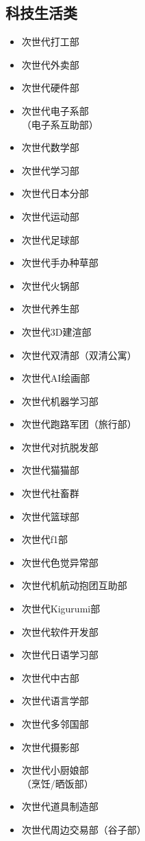 \documentclass[twoside,12pt]{book}
\newenvironment{categorysection}[1]{
  \subsection*{\textcolor{truepurple}{#1}}
  \begin{itemize}[leftmargin=*, 
                 nosep,               %
                 itemsep=2pt,         %
                 parsep=0pt,          %
                 before=\setlength{\baselineskip}{23pt} %
  ]
}{
  \end{itemize}
}
\begin{document}
\begin{multicols}{3}
    \begin{categorysection}{科技生活类}
        \item 次世代打工部
        \item 次世代外卖部
        \item 次世代硬件部
        \item 次世代电子系部\\（电子系互助部）
        \item 次世代数学部
        \item 次世代学习部
        \item 次世代日本分部
        \item 次世代运动部
        \item 次世代足球部
        \item 次世代手办种草部
        \item 次世代火锅部
        \item 次世代养生部
        \item 次世代3D建渲部
        \item 次世代双清部（双清公寓）
        \item 次世代AI绘画部
        \item 次世代机器学习部
        \item 次世代跑路军团（旅行部）
        \item 次世代对抗脱发部
        \item 次世代猫猫部
        \item 次世代社畜群
        \item 次世代篮球部
        \item 次世代f1部
        \item 次世代色觉异常部
        \item 次世代机航动抱团互助部
        \item 次世代Kigurumi部
        \item 次世代软件开发部
        \item 次世代日语学习部
        \item 次世代中古部
        \item 次世代语言学部
        \item 次世代多邻国部
        \item 次世代摄影部
        \item 次世代小厨娘部\\（烹饪/晒饭部）
        \item 次世代道具制造部
        \item 次世代周边交易部（谷子部）
    \end{categorysection}

\end{multicols}
\end{document}
